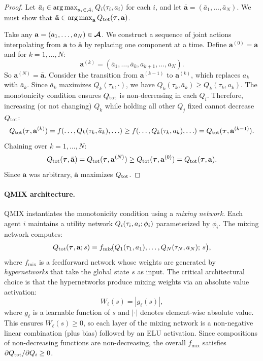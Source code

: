\documentclass[11pt,a4paper]{article}
\begin{document}
\begin{proof}
Let $\bar{a}_i \in \operatorname{arg\,max}_{a_i \in \mathcal{A}_i} Q_i(\tau_i,
a_i)$ for each $i$, and let $\bar{\mathbf{a}} = (\bar{a}_1,
\ldots, \bar{a}_N)$.  We must show that $\bar{\mathbf{a}} \in
\operatorname{arg\,max}_{\mathbf{a}} Q_{\mathrm{tot}}(\boldsymbol{\tau}, \mathbf{a})$.

Take any $\mathbf{a} = (a_1, \ldots, a_N) \in \boldsymbol{\mathcal{A}}$.
We construct a sequence of joint actions interpolating from
$\mathbf{a}$ to $\bar{\mathbf{a}}$ by replacing one component
at a time.  Define $\mathbf{a}^{(0)} = \mathbf{a}$ and for
$k = 1, \ldots, N$:
\[
  \mathbf{a}^{(k)} = (\bar{a}_1, \ldots, \bar{a}_k, a_{k+1},
  \ldots, a_N).
\]
So $\mathbf{a}^{(N)} = \bar{\mathbf{a}}$.  Consider the
transition from $\mathbf{a}^{(k-1)}$ to $\mathbf{a}^{(k)}$,
which replaces $a_k$ with $\bar{a}_k$.  Since $\bar{a}_k$
maximizes $Q_k(\tau_k, \cdot)$, we have $Q_k(\tau_k, \bar{a}_k)
\geq Q_k(\tau_k, a_k)$.  The monotonicity condition ensures
$Q_{\mathrm{tot}}$ is non-decreasing in each $Q_i$.  Therefore, increasing
(or not changing) $Q_k$ while holding all other $Q_j$ fixed
cannot decrease $Q_{\mathrm{tot}}$:
\[
  Q_{\mathrm{tot}}(\boldsymbol{\tau}, \mathbf{a}^{(k)})
  = f(\ldots, Q_k(\tau_k, \bar{a}_k), \ldots)
  \geq f(\ldots, Q_k(\tau_k, a_k), \ldots)
  = Q_{\mathrm{tot}}(\boldsymbol{\tau}, \mathbf{a}^{(k-1)}).
\]
Chaining over $k = 1, \ldots, N$:
\[
  Q_{\mathrm{tot}}(\boldsymbol{\tau}, \bar{\mathbf{a}})
  = Q_{\mathrm{tot}}(\boldsymbol{\tau}, \mathbf{a}^{(N)})
  \geq Q_{\mathrm{tot}}(\boldsymbol{\tau}, \mathbf{a}^{(0)})
  = Q_{\mathrm{tot}}(\boldsymbol{\tau}, \mathbf{a}).
\]
Since $\mathbf{a}$ was arbitrary, $\bar{\mathbf{a}}$ maximizes
$Q_{\mathrm{tot}}$.
\end{proof}

\paragraph{QMIX architecture.}
QMIX \citep{rashid2018} instantiates the monotonicity condition
using a \emph{mixing network}.  Each agent $i$ maintains a utility
network $Q_i(\tau_i, a_i; \phi_i)$ parameterized by $\phi_i$.
The mixing network computes:
\begin{equation}
\label{eq:qmix}
  Q_{\mathrm{tot}}(\boldsymbol{\tau}, \mathbf{a}; s)
  = f_{\mathrm{mix}}\!\big(Q_1(\tau_1, a_1), \ldots,
    Q_N(\tau_N, a_N);\, s\big),
\end{equation}
where $f_{\mathrm{mix}}$ is a feedforward network whose weights
are generated by \emph{hypernetworks} that take the global state
$s$ as input.  The critical architectural choice is that the
hypernetworks produce mixing weights via an absolute value
activation:
\[
  W_{\ell}(s) = |g_{\ell}(s)|,
\]
where $g_{\ell}$ is a learnable function of $s$ and $|\cdot|$
denotes element-wise absolute value.  This ensures $W_{\ell}(s)
\geq 0$, so each layer of the mixing network is a non-negative
linear combination (plus bias) followed by an ELU activation.
Since compositions of non-decreasing functions are non-decreasing,
the overall $f_{\mathrm{mix}}$ satisfies $\partial Q_{\mathrm{tot}} /
\partial Q_i \geq 0$.
\end{document}
